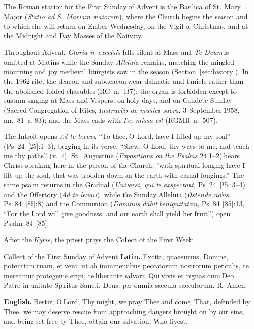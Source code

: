 The Roman station for the First Sunday of Advent is the Basilica of
St.~Mary Major (\textit{Statio ad S.\ Mariam maiorem}), where the
Church begins the season and to which she will return on Ember
Wednesday, on the Vigil of Christmas, and at the Midnight and Day Masses
of the Nativity.

Throughout Advent, \textit{Gloria in excelsis} falls silent at Mass and
\textit{Te Deum} is omitted at Matins while the Sunday \textit{Alleluia}
remains, matching the mingled mourning and joy medieval liturgists saw in
the season (Section~\ref{sec:history}). In the 1962 rite, the deacon and
subdeacon wear dalmatic and tunicle rather than the abolished folded
chasubles (RG~n.~137); the organ is forbidden except to sustain singing at
Mass and Vespers, on holy days, and on Gaudete Sunday (Sacred Congregation
of Rites, \textit{Instructio de musica sacra}, 3~September 1958,
nn.~81~a, 83); and the Mass ends with \textit{Ite, missa est}
(RGMR~n.~507).

The Introit opens \textit{Ad te levavi}, ``To thee, O Lord, have I
lifted up my soul'' (Ps~24~[25]:1--3), begging in its verse, ``Shew, O
Lord, thy ways to me, and teach me thy paths'' (v.~4). St.~Augustine
(\textit{Expositions on the Psalms} 24.1--2) hears Christ speaking here
in the person of the Church: ``with spiritual longing have I lift up the
soul, that was trodden down on the earth with carnal longings.'' The
same psalm returns in the Gradual (\textit{Universi, qui te exspectant},
Ps~24~[25]:3--4) and the Offertory (\textit{Ad te levavi}), while the
Sunday Alleluia (\textit{Ostende nobis}, Ps~84~[85]:8) and the Communion
(\textit{Dominus dabit benignitatem}, Ps~84~[85]:13, ``For the Lord will
give goodness: and our earth shall yield her fruit'') open Psalm~84~[85].

After the \textit{Kyrie}, the priest prays the Collect of the First Week:

\begin{massbox}{Collect of the First Sunday of Advent}
\textbf{Latin.} Excita, quaesumus, Domine, potentiam tuam, et veni: ut
ab imminentibus peccatorum nostrorum periculis, te mereamur protegente
eripi, te liberante salvari: Qui vivis et regnas cum Deo Patre in
unitate Spiritus Sancti, Deus: per omnia saecula saeculorum. R.~Amen.

\textbf{English.} Bestir, O Lord, Thy might, we pray Thee and come;
That, defended by Thee, we may deserve rescue from approaching dangers
brought on by our sins, and being set free by Thee, obtain our
salvation. Who livest.
\end{massbox}

